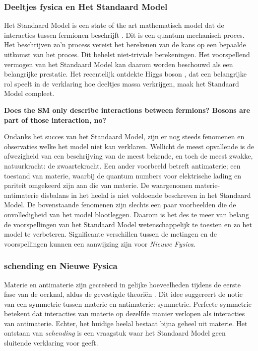 \subsubsection{Deeltjes fysica en Het Standaard Model}
Het Standaard Model is een state of the art mathematisch model dat de interacties tussen fermionen beschrijft \cite{sm-glashow,sm-weinberg,sm-salam}. Dit is een quantum mechanisch proces. Het beschrijven zo'n process vereist het berekenen van de kans op een bepaalde uitkomst van het proces. Dit behelst niet-triviale berekeningen. Het voorspellend vermogen van het Standaard Model kan daarom worden beschouwd als een belangrijke prestatie. Het recentelijk ontdekte Higgs boson \cite{higgs-cms,higgs-atlas}, dat een belangrijke rol speelt in de verklaring hoe deeltjes massa verkrijgen, maak het Standaard Model compleet.

\textbf{Does the SM only describe interactions between fermions? Bosons are part of those interaction, no?}

Ondanks het succes van het Standaard Model, zijn er nog steeds fenomenen en observaties welke het model niet kan verklaren. Wellicht de meest opvallende is de afwezigheid van een beschrijving van de meest bekende, en toch de meest zwakke, natuurkracht: de zwaartekracht. Een ander voorbeeld betreft antimaterie; een toestand van materie, waarbij de quantum numbers voor elektrische lading en pariteit omgekeerd zijn aan die van materie. De waargenomen materie-antimaterie disbalans in het heelal \cite{more-cpv-huet,more-cpv-gavela_I,more-cpv-gavela_II} is niet voldoende beschreven in het Standaard Model. De bovenstaande fenomenen zijn slechts een paar voorbeelden die de onvolledigheid van het model blootleggen. Daarom is het des te meer van belang de voorspellingen van het Standaard Model wetenschappelijk te toesten en zo het model te verbeteren. Significante verschillen tussen de metingen en de voorspellingen kunnen een aanwijzing zijn voor {\it Nieuwe Fysica}.



\subsubsection{\CP schending en Nieuwe Fysica}
Materie en antimaterie zijn gecre\"eerd in gelijke hoeveelheden tijdens de eerste fase van de oerknal, aldus de gevestigde theori\"en \cite{more-cpv-huet,more-cpv-gavela_I,more-cpv-gavela_II}. Dit idee suggereert de notie van een symmetrie tussen materie en antimaterie: \CP symmetrie. Perfecte \CP symmetrie betekent dat interacties van materie op dezelfde manier verlopen als interacties van antimaterie. Echter, het huidige heelal bestaat bijna geheel uit materie. Het ontstaan van  {\it \CP schending} is een vraagstuk waar het Standaard Model geen sluitende verklaring voor geeft.


